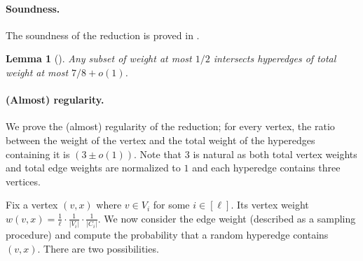 \documentclass[11pt]{article}
\newtheorem{lemma}[theorem]{Lemma}
\begin{document}
\paragraph{Soundness.} The soundness of the reduction is proved in \cite{Cohen-AddadSL22}.
\begin{lemma}[\cite{Cohen-AddadSL22}] Any subset of weight at most $1/2$ intersects hyperedges of total weight at most $7/8 + o(1)$.     
\end{lemma}

\paragraph{(Almost) regularity.}
We prove the (almost) regularity of the reduction; for every vertex, the ratio between the weight of the vertex and the total weight of the hyperedges containing it is $(3 \pm o(1))$. Note that $3$ is natural as both total vertex weights and total edge weights are normalized to $1$ and each hyperedge contains three vertices. 

Fix a vertex $(v, x)$ where $v \in V_i$ for some $i \in [\ell]$. Its vertex weight $w(v, x) = \frac{1}{\ell} \cdot \frac{1}{|V_i|} \cdot \frac{1}{|C_i|}$. 
We now consider the edge weight (described as a sampling procedure) and compute the probability that a random hyperedge contains $(v, x)$. There are two possibilities. 
\end{document}
